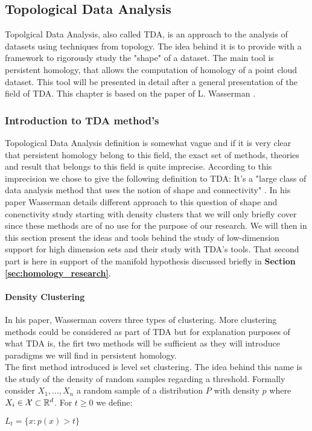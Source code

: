 \documentclass[12pt, a4paper]{article}
\begin{document}
\subsection{Topological Data Analysis}

Topolgical Data Analysis, also called TDA, is an approach to the analysis of datasets using techniques from topology. The idea behind it is to provide with a framework to rigorously study the "shape" of a dataset. The main tool is persistent homology, that allows the computation of homology of a point cloud dataset. This tool will be presented in detail after a general presentation of the field of TDA. This chapter is based on the paper of L. Wasserman \cite{wasserman_topological_2016}. 

\subsubsection{Introduction to TDA method's}

Topological Data Analysis definition is somewhat vague and if it is very clear that persistent homology belong to this field, the exact set of methods, theories and result that belongs to this field is quite imprecise. According to this imprecision we chose to give the following definition to TDA: It's a "large class of data analysis method that uses the notion of shape and connectivity" \cite{wasserman_topological_2016}. In his paper Wasserman details different approach to this question of shape and conenctivity study starting with density clusters that we will only briefly cover since these methods are of no use for the purpose of our research. We will then in this section present the ideas and tools behind the study of low-dimension support for high dimension sets and their study with TDA's tools. That second part is here in support of the manifold hypothesis discussed briefly in \textbf{Section \ref{sec:homology_research}}.

\paragraph{Density Clustering}

In his paper, Wasserman covers three types of clustering. More clustering methods could be considered as part of TDA but for explanation purposes of what TDA is, the firt two methods will be sufficient as they will introduce paradigms we will find in persistent homology.\\

The first method introduced is level set clustering. The idea behind this name is the study of the density of random samples regarding a threshold. Formally consider $X_1, ..., X_n$ a random sample of a distribution $P$ with density $p$ where $X_i \in \mathcal{X} \subset \mathbb{R}^d$. For $t \ge 0$ we define:
  \begin{center}
    $L_t = \lbrace x : p(x) > t \rbrace$
  \end{center}
\end{document}
